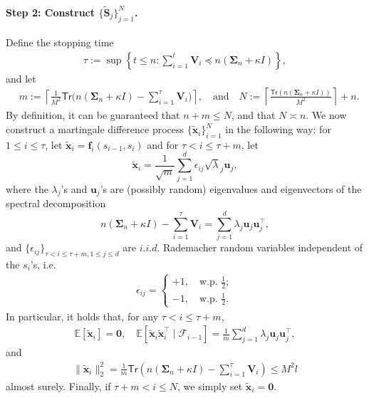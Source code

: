 \paragraph{Step 2: Construct $\{\tilde{\bm{S}}_j\}_{j=1}^N$.} Define the stopping time
\begin{align*}
\tau := \sup\left\{t \leq n: \sum_{i=1}^t \bm{V}_i \preceq n (\bm{\Sigma}_n + \kappa I)\right\},
\end{align*}
and let
\begin{align*}
&m:= \left\lceil \frac{1}{M^2} \mathsf{Tr}\Big(n (\bm{\Sigma}_n + \kappa I) - \sum_{i=1}^\tau \bm{V}_i\Big) \right\rceil, \quad \text{and} \quad N:= \left\lceil \frac{\mathsf{Tr}(n (\bm{\Sigma}_n + \kappa I))}{M^2} \right\rceil + n.
\end{align*}
By definition, it can be guaranteed that $n+m \leq N$, and that $N \asymp n$. We now construct a martingale difference process $\{ \tilde{\bm{x}}_i \}_{i=1}^{N}$ in the following way: for $1 \leq i \leq \tau$, let $\tilde{\bm{x}}_i = \bm{f}_i(s_{i-1},s_i)$ and for $\tau < i \leq \tau + m$, let 
\[
\tilde{\bm{x}}_i = \frac{1}{\sqrt{m}}\sum_{j=1}^d \epsilon_{ij} \sqrt{\lambda}_j \bm{u}_j,
\]
where the $\lambda_j$'s and $\bm{u}_j$'s are (possibly random) eigenvalues and eigenvectors of the spectral decomposition 
\[
n (\bm{\Sigma}_n + \kappa I) - \sum_{i=1}^\tau \bm{V}_i = \sum_{j=1}^d \lambda_j \bm{u}_j \bm{u}_j^\top,
\]
and $\{\epsilon_{ij}\}_{\tau < i \leq \tau + m, 1 \leq j \leq d}$ are $i.i.d.$ Rademacher random variables independent of the $s_i$'s, i.e.
\begin{align*}
\epsilon_{ij} = \begin{cases}
+1, \quad \text{w.p. }\frac{1}{2}; \\ 
-1, \quad \text{w.p. }\frac{1}{2}.
\end{cases}
\end{align*}
In particular, it holds that, for any $ \tau < i \leq \tau + m$,  
\begin{align*}
\mathbb{E}[\tilde{\bm{x}}_i] = \bm{0}, \quad \mathbb{E}[\tilde{\bm{x}}_i \tilde{\bm{x}}_i^\top\mid \mathscr{F}_{i-1}] = \frac{1}{m} \sum_{j=1}^d \lambda_j \bm{u}_j \bm{u}_j^\top,
\end{align*}
and 
\begin{align*}
\|\tilde{\bm{x}}_i\|_2^2 = \frac{1}{m} \mathsf{Tr}\left(n (\bm{\Sigma}_n + \kappa I) - \sum_{i=1}^\tau \bm{V}_i\right) \leq M^2l
\end{align*}
almost surely. Finally, if $\tau + m < i \leq  N$, we simply set $\tilde{\bm{x}}_i = \bm{0}$. 

